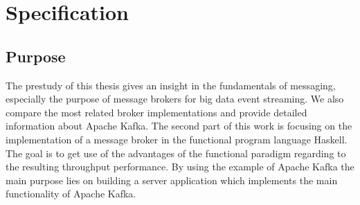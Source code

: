 \chapter{Specification}
\section{Purpose}
The prestudy of this thesis gives an insight in the fundamentals of messaging, especially
the purpose of message brokers for big data event streaming. We also compare
the most related broker implementations and provide detailed information about Apache
Kafka. The second part of this work is focusing on the implementation of a message
broker in the functional program language Haskell. The goal is to get
use of the advantages of the functional paradigm regarding to the resulting
throughput performance. By using the example of Apache Kafka the main purpose
lies on building a server application which implements the main functionality of
Apache Kafka. 

